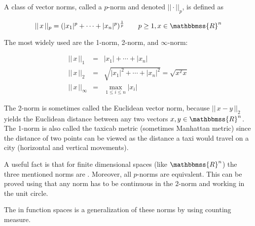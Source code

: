 \documentclass[12pt]{article}
\newcommand{\R}{\mathbbmss{R}}
\begin{document}
A class of vector norms, called a $p$-norm and denoted $||\cdot||_p$, is defined as

\begin{displaymath}
    ||\,x\,||_p = (|x_1|^p + \cdots + |x_n|^p)^\frac{1}{p}\qquad p\geq1, x\in\R^n
\end{displaymath}

The most widely used are the 1-norm, 2-norm, and $\infty$-norm:

\begin{eqnarray*}
    ||\,x\,||_1 & =& |x_1| + \cdots + |x_n| \\
    ||\,x\,||_2 & =& \sqrt{|x_1|^2 + \cdots + |x_n|^2} = \sqrt{x^Tx} \\
    ||\,x\,||_\infty & =& \displaystyle\max_{1\leq i\leq n}|x_i|
\end{eqnarray*}

The 2-norm is sometimes called the Euclidean vector norm, because
$||\,x-y\,||_2$ yields the Euclidean distance between any two vectors $x,y\in \R^n$. The 1-norm is also called the taxicab metric (sometimes Manhattan metric) since the distance of two points can be viewed as the distance a taxi would travel on a city (horizontal and vertical movements).

A useful fact is that for finite dimensional spaces (like $\R^n$) the three mentioned norms are . Moreover, all $p$-norms are equivalent. This can be proved using that any norm  has to be continuous in the $2$-norm and working in the unit circle.

The  in function spaces is a generalization of these norms by using counting measure.
\end{document}
